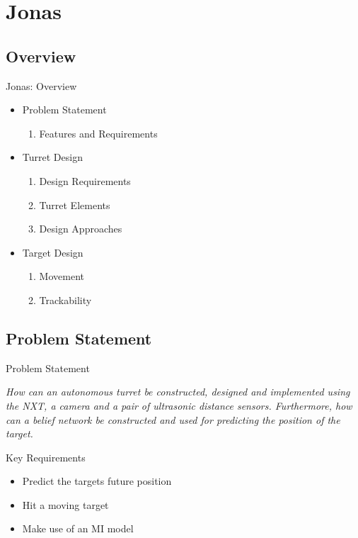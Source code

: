 \section{Jonas}
\subsection{Overview}
\begin{frame}{Jonas: Overview}
\begin{itemize}
  \item Problem Statement
  		\begin{enumerate}
  			\item Features and Requirements
		\end{enumerate}
  \item Turret Design
  		\begin{enumerate}
  			\item Design Requirements
  			\item Turret Elements
  			\item Design Approaches
		\end{enumerate}
  \item Target Design
  		\begin{enumerate}
  			\item Movement
  		 	\item Trackability
		\end{enumerate}
\end{itemize}
\end{frame}

\subsection{Problem Statement}
\begin{frame}{Problem Statement}
\begin{center}
\begin{minipage}{0.8\linewidth}
\textit{How can an autonomous turret be constructed, designed and implemented
using the NXT, a camera and a pair of ultrasonic distance sensors. Furthermore,
how can a belief network be constructed and used for predicting the position
of the target.}
\end{minipage}
\end{center}
\end{frame}

\begin{frame}{Key Requirements}
\begin{itemize}
	\item Predict the targets future position
	\item Hit a moving target
	\item Make use of an MI model
\end{itemize}
\end{frame}

